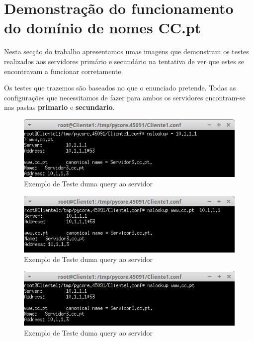 \documentclass{llncs}
\begin{document}
\newpage

\section{Demonstração do funcionamento do domínio de nomes CC.pt}

Nesta secção do trabalho apresentamos umas imagens que demonstram os testes realizados aos servidores primário e secundário na tentativa de ver que estes se encontravam a funcionar corretamente.

Os testes que trazemos são baseados no que o enunciado pretende. Todas as configurações que necessitamos de fazer para ambos os servidores encontram-se nas pastas \textbf{primario} e \textbf{secundario}.

\begin{figure}[H]
\begin{center}
\includegraphics[scale=0.75]{teste1.png}
\end{center}
\caption{\label{fig:t1}Exemplo de Teste duma query ao servidor}
\end{figure}

\begin{figure}[H]
\begin{center}
\includegraphics[scale=0.75]{teste2.png}
\end{center}
\caption{\label{fig:t2}Exemplo de Teste duma query ao servidor}
\end{figure}

\begin{figure}[H]
\begin{center}
\includegraphics[scale=0.75]{teste3.png}
\end{center}
\caption{\label{fig:t3}Exemplo de Teste duma query ao servidor}
\end{figure}
\end{document}
